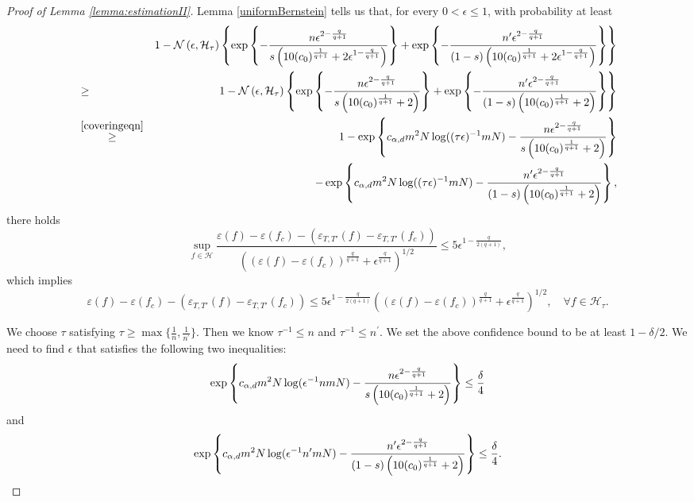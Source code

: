 \documentclass{article}
\begin{document}
\begin{proof}[Proof of Lemma \ref{lemma:estimationII}]
    Lemma \ref{uniformBernstein} tells us that, for every $0<\epsilon \leq 1$, with probability at least 
    \begin{eqnarray*}
&&1-  {\mathcal N}\left(\epsilon, {\mathcal H_\tau}\right) \left\{\exp \left\{-
{n \epsilon^{2-{\frac{q}{q+1}}} \over s\left(10 (c_0)^{\frac{1}{q+1}} +2 \epsilon^{1-{\frac{q}{q+1}}}\right)}\right\}
+\exp \left\{-
{n' \epsilon^{2-{\frac{q}{q+1}}} \over (1-s) \left(10 (c_0)^{\frac{1}{q+1}} +2 \epsilon^{1-{\frac{q}{q+1}}}\right)}\right\}\right\}\\
&\geq& 1-  {\mathcal N}\left(\epsilon, {\mathcal H_\tau}\right) \left\{\exp \left\{-
{n \epsilon^{2-{\frac{q}{q+1}}} \over s\left(10 (c_0)^{\frac{1}{q+1}} +2 \right)}\right\} +\exp \left\{-
{n' \epsilon^{2-{\frac{q}{q+1}}} \over (1-s) \left(10 (c_0)^{\frac{1}{q+1}} +2 \right)}\right\}\right\}\\
&\stackrel{\eqref{coveringeqn}}{\geq}& 1- \exp \left\{c_{\alpha, d} m^2 N \log ((\tau\epsilon)^{-1}mN) -
{n \epsilon^{2-{\frac{q}{q+1}}} \over s\left(10 (c_0)^{\frac{1}{q+1}} +2 \right)}\right\}\\
&& -\exp \left\{c_{\alpha, d} m^2 N \log ((\tau\epsilon)^{-1}mN)-
{n' \epsilon^{2-{\frac{q}{q+1}}} \over (1-s) \left(10 (c_0)^{\frac{1}{q+1}} +2 \right)}\right\} ,
\end{eqnarray*} 
there holds
$$\sup_{f\in {\mathcal H}} \frac{\varepsilon (f) - \varepsilon (f_c) - \left(\varepsilon_{T, T'} (f) - \varepsilon_{T, T'} (f_c)\right)}{\left(\left(\varepsilon (f) - \varepsilon (f_c)\right)^{\frac{q}{q+1}} + \epsilon^{\frac{q}{q+1}}\right)^{1/2}} \leq 5 \epsilon^{1-{\frac{q}{2(q+1)}}},
$$
which implies 
\begin{equation}\label{5epsilon}
    \varepsilon (f) - \varepsilon (f_c) - \left(\varepsilon_{T, T'} (f) - \varepsilon_{T, T'} (f_c)\right)\leq 5 \epsilon^{1-{\frac{q}{2(q+1)}}}\left(\left(\varepsilon (f) - \varepsilon (f_c)\right)^{\frac{q}{q+1}} + \epsilon^{\frac{q}{q+1}}\right)^{1/2}, \quad \forall f\in \mathcal{H}_\tau. 
\end{equation}

We choose $\tau$ satisfying $\tau \geq \max\{\frac{1}{n}, \frac{1}{n^\prime}\}$.
Then we know $\tau^{-1} \leq n$ and $\tau^{-1} \leq n^\prime$.
We set the above confidence bound to be at least $1-\delta/2$. We need to find $\epsilon$ that satisfies the following two inequalities:
$$\exp \left\{c_{\alpha, d} m^2 N \log (\epsilon^{-1}nmN) -
{n \epsilon^{2-{\frac{q}{q+1}}} \over s\left(10 (c_0)^{\frac{1}{q+1}} +2 \right)}\right\} \leq \frac{\delta}{4}$$
and 
$$\exp \left\{c_{\alpha, d} m^2 N \log (\epsilon^{-1}n^\prime mN)-
{n' \epsilon^{2-{\frac{q}{q+1}}} \over (1-s) \left(10 (c_0)^{\frac{1}{q+1}} +2 \right)}\right\} \leq \frac{\delta}{4}.$$ 


\end{proof}
\end{document}
